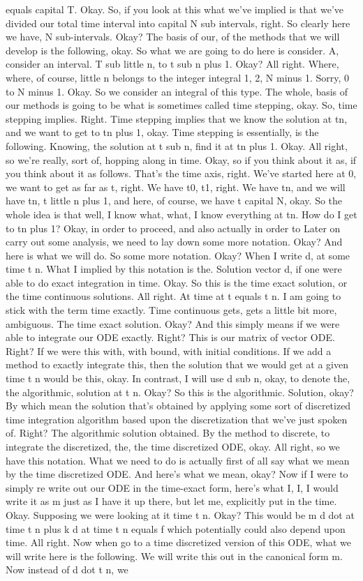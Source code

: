 \documentclass[10pt]{article}
\begin{document}
equals capital T. Okay. So, if you look at this what we've implied is that we've divided our total time interval into capital N sub intervals, right. So clearly here we have, N sub-intervals. Okay? The basis of our, of the methods that we will develop is the following, okay. So what we are going to do here is consider. A, consider an interval. T sub little n, to t sub n plus 1. Okay? All right. Where, where, of course, little n belongs to the integer integral 1, 2, N minus 1. Sorry, 0 to N minus 1. Okay. So we consider an integral of this type. The whole, basis of our methods is going to be what is sometimes called time stepping, okay. So, time stepping implies. Right. Time stepping implies that we know the solution at tn, and we want to get to tn plus 1, okay. Time stepping is essentially, is the following. Knowing, the solution at t sub n, find it at tn plus 1. Okay. All right, so we're really, sort of, hopping along in time. Okay, so if you think about it as, if you think about it as follows. That's the time axis, right. We've started here at 0, we want to get as far as t, right. We have t0, t1, right. We have tn, and we will have tn, t little n plus 1, and here, of course, we have t capital N, okay. So the whole idea is that well, I know what, what, I know everything at tn. How do I get to tn plus 1? Okay, in order to proceed, and also actually in order to Later on carry out some analysis, we need to lay down some more notation. Okay? And here is what we will do. So some more notation. Okay? When I write d, at some time t n. What I implied by this notation is the. Solution vector d, if one were able to do exact integration in time. Okay. So this is the time exact solution, or the time continuous solutions. All right. At time at t equals t n. I am going to stick with the term time exactly. Time continuous gets, gets a little bit more, ambiguous. The time exact solution. Okay? And this simply means if we were able to integrate our ODE exactly. Right? This is our matrix of vector ODE. Right? If we were this with, with bound, with initial conditions. If we add a method to exactly integrate this, then the solution that we would get at a given time t n would be this, okay. In contrast, I will use d sub n, okay, to denote the, the algorithmic, solution at t n. Okay? So this is the algorithmic. Solution, okay? By which mean the solution that's obtained by applying some sort of discretized time integration algorithm based upon the discretization that we've just spoken of. Right? The algorithmic solution obtained. By the method to discrete, to integrate the discretized, the, the time discretized ODE, okay. All right, so we have this notation. What we need to do is actually first of all say what we mean by the time discretized ODE. And here's what we mean, okay? Now if I were to simply re write out our ODE in the time-exact form, here's what I, I, I would write it as m just as I have it up there, but let me, explicitly put in the time. Okay. Supposing we were looking at it time t n. Okay? This would be m d dot at time t n plus k d at time t n equals f which potentially could also depend upon time. All right. Now when go to a time discretized version of this ODE, what we will write here is the following. We will write this out in the canonical form m. Now instead of d dot t n, we 
\end{document}
